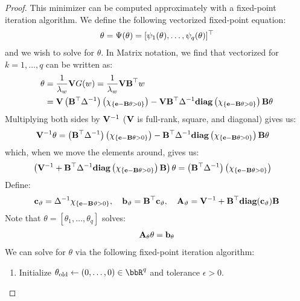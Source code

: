 \documentclass[12pt,leqno,letterpaper]{article}
\begin{document}
\begin{proof}
 This minimizer can be computed approximately with a fixed-point iteration algorithm.  We define the following vectorized fixed-point equation:
 \begin{align}
\theta = \Psi(\theta) = [ \psi_1(\theta), \ldots, \psi_q(\theta)]^\top
 \end{align}
 and we wish to solve for $\theta$.
 In Matrix notation, we find that  vectorized for $k=1,\ldots,q$ can be written as:
 \begin{align}
 \theta &= \frac{1}{\lambda_w}\mathbf{V} G(w) = \frac{1}{\lambda_w} \mathbf{VB}^\top w\\
 &= \mathbf{V} \left(\mathbf{B}^\top \Delta^{-1}\right)\left(\mathbf{\chi}_{\{\mathbf{e}-\mathbf{B} \theta>0\}}\right) - \mathbf{V} \mathbf{B}^\top \Delta^{-1} \textbf{diag}\left(\mathbf{\chi}_{\{\mathbf{e}-\mathbf{B} \theta>0\}}\right)\mathbf{B} \theta
 \end{align}
 Multiplying  both sides by $\mathbf{V}^{-1}$ ($\mathbf{V}$ is full-rank, square, and diagonal) gives us:
 \begin{align}
\mathbf{V}^{-1} \theta &=  \left(\mathbf{B}^\top \Delta^{-1}\right)\left(\mathbf{\chi}_{\{\mathbf{e}-\mathbf{B} \theta>0\}}\right) -  \mathbf{B}^\top \Delta^{-1} \textbf{diag}\left(\mathbf{\chi}_{\{\mathbf{e}-\mathbf{B} \theta>0\}}\right)\mathbf{B} \theta
\end{align} which, when we move the elements around, gives us:
\begin{align}
\left(\mathbf{V}^{-1} +\mathbf{B}^\top \Delta^{-1} \textbf{diag}\left(\mathbf{\chi}_{\{\mathbf{e}-\mathbf{B} \theta>0\}}\right)\mathbf{B}\right) \theta &= \left(\mathbf{B}^\top \Delta^{-1}\right)\left(\mathbf{\chi}_{\{\mathbf{e}-\mathbf{B} \theta>0\}}\right)
 \end{align}
Define:
\begin{align} \label{linsys}
\mathbf{c_\vartheta} = \Delta^{-1} \mathbf{\chi}_{\{\mathbf{e}-\mathbf{B} \vartheta>0\}}, \quad \mathbf{b_\vartheta} =\mathbf{B}^\top \mathbf{c_\vartheta}, \quad \mathbf{A_\vartheta} = \mathbf{V}^{-1} + \mathbf{B^\top \textbf{diag}(c_\vartheta) B}
\end{align}
Note that $\theta=[\theta_1, \ldots, \theta_q]$ solves:
\begin{align}
\mathbf{A}_\theta \theta = \mathbf{b}_\theta
\end{align}
We can solve for $\theta$ via the following fixed-point iteration algorithm:
\newcommand{\told}{\theta_{\text{old}}}
\newcommand{\tnew}{\theta_{\text{new}}}
\begin{algorithm}[hpt!]
\vspace{0.16in}
\begin{enumerate}[label=\textbf{\arabic*.},
  itemindent=0.32in, itemsep=0.032in]
\item Initialize $\told \leftarrow (0, \dots, 0) \in \bbR^q$ 
and tolerance $\epsilon > 0$.

\end{enumerate}
\end{algorithm}
\end{proof}
\end{document}
